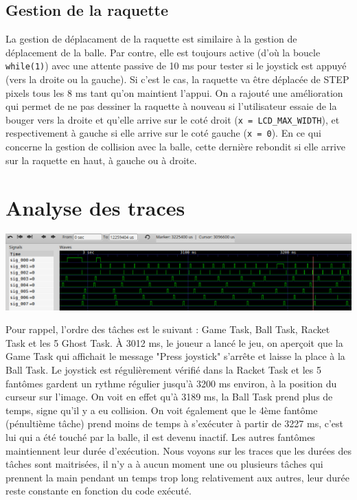 \documentclass[a4paper]{article}
\begin{document}
\subsection{Gestion de la raquette}
La gestion de déplacament de la raquette est similaire à la gestion de déplacement de la balle. Par contre,
elle est toujours active (d'où la boucle \texttt{while(1)}) avec une attente passive de 10 ms pour tester
si le joystick est appuyé (vers la droite ou la gauche). Si c'est le cas, la raquette va être déplacée de STEP
pixels tous les 8 ms tant qu'on maintient l'appui. On a rajouté une amélioration qui permet de ne pas dessiner
la raquette à nouveau si l'utilisateur essaie de la bouger vers la droite et qu'elle arrive sur le coté droit
(\texttt{x = LCD_MAX_WIDTH}), et respectivement à gauche si elle arrive sur le coté gauche (\texttt{x = 0}).
\newline
En ce qui concerne la gestion de collision avec la balle, cette dernière rebondit si elle arrive sur la raquette
en haut, à gauche ou à droite.

\section{Analyse des traces}
\begin{center}
\includegraphics[scale=0.455]{../traces/traces1.png}
\end{center}
Pour rappel, l'ordre des tâches est le suivant : Game Task, Ball Task, Racket Task et les 5 Ghost Task.
À 3012 ms, le joueur a lancé le jeu, on aperçoit que la Game Task qui affichait le message "Press joystick"
s'arrête et laisse la place à la Ball Task. Le joystick est régulièrement vérifié dans la Racket Task et les
5 fantômes gardent un rythme régulier jusqu'à 3200 ms environ, à la position du curseur sur l'image. On voit
en effet qu'à 3189 ms, la Ball Task prend plus de temps, signe qu'il y a eu collision. On voit également que
le 4ème fantôme (pénultième tâche) prend moins de temps à s'exécuter à partir de 3227 ms, c'est lui qui a été
touché par la balle, il est devenu inactif. Les autres fantômes maintiennent leur durée d'exécution.
\newline
Nous voyons sur les traces que les durées des tâches sont maitrisées, il n'y a à aucun moment une ou plusieurs
tâches qui prennent la main pendant un temps trop long relativement aux autres, leur durée reste constante en
fonction du code exécuté.
\end{document}
